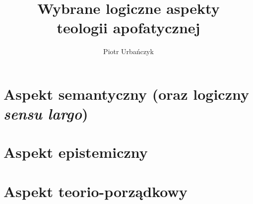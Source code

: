 \documentclass[12pt,a4paper,openany,oneside,leqno,titlepage]{report}
\title{Wybrane logiczne aspekty\\teologii apofatycznej}
\author{Piotr Urbańczyk}
\theoremstyle{definition}
\begin{document}
\stronatytulowa

\tableofcontents
\listoffigures

\cleardoublepage





\part{Aspekt semantyczny (oraz logiczny \textit{sensu largo})}





\part{Aspekt epistemiczny}



\part{Aspekt teorio-porządkowy}







%

%
%



%
%
\end{document}
